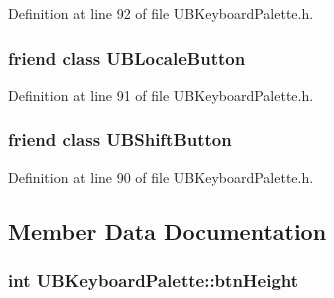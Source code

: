 Definition at line 92 of file U\-B\-Keyboard\-Palette.\-h.

\hypertarget{class_u_b_keyboard_palette_ad529f92a5b8f216b0a349c6ef547780f}{
\subsubsection[{U\-B\-Locale\-Button}]{\setlength{\rightskip}{0pt plus 5cm}friend class {\bf U\-B\-Locale\-Button}\hspace{0.3cm}{\ttfamily [friend]}}}\label{d6/d6e/class_u_b_keyboard_palette_ad529f92a5b8f216b0a349c6ef547780f}


Definition at line 91 of file U\-B\-Keyboard\-Palette.\-h.

\hypertarget{class_u_b_keyboard_palette_a1b5e1692d61dd3978962a4590ba37a49}{
\subsubsection[{U\-B\-Shift\-Button}]{\setlength{\rightskip}{0pt plus 5cm}friend class {\bf U\-B\-Shift\-Button}\hspace{0.3cm}{\ttfamily [friend]}}}\label{d6/d6e/class_u_b_keyboard_palette_a1b5e1692d61dd3978962a4590ba37a49}


Definition at line 90 of file U\-B\-Keyboard\-Palette.\-h.



\subsection{Member Data Documentation}
\hypertarget{class_u_b_keyboard_palette_a8962dc6970979b1e417b39ba7ad05975}{
\subsubsection[{btn\-Height}]{\setlength{\rightskip}{0pt plus 5cm}int U\-B\-Keyboard\-Palette\-::btn\-Height\hspace{0.3cm}{\ttfamily [protected]}}}\label{d6/d6e/class_u_b_keyboard_palette_a8962dc6970979b1e417b39ba7ad05975}


